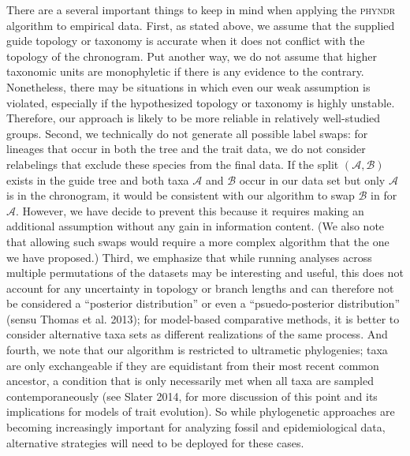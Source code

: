 \documentclass[a4paper,11pt]{article}
\begin{document}
There are a several important things to keep in mind when applying the \textsc{phyndr} algorithm to empirical data. First, as stated above, we assume that the supplied guide topology or taxonomy is accurate when it does not conflict with the topology of the chronogram. Put another way, we do not assume that higher taxonomic units are monophyletic if there is any evidence to the contrary. Nonetheless, there may be situations in which even our weak assumption is violated, especially if the hypothesized topology or taxonomy is highly unstable. Therefore, our approach is likely to be more reliable in relatively well-studied groups. Second, we technically do not generate all possible label swaps: for lineages that occur in both the tree and the trait data, we do not consider relabelings that exclude these species from the final data. If the split $(\mathcal{A,B})$ exists in the guide tree and both taxa $\mathcal{A}$ and $\mathcal{B}$ occur in our data set but only $\mathcal{A}$ is in the chronogram, it would be consistent with our algorithm to swap $\mathcal{B}$ in for $\mathcal{A}$. However, we have decide to prevent this because it requires making an additional assumption without any gain in information content. (We also note that allowing such swaps would require a more complex algorithm that the one we have proposed.) Third, we emphasize that while running analyses across multiple permutations of the datasets may be interesting and useful, this does not account for any uncertainty in topology or branch lengths and can therefore not be considered a ``posterior distribution'' or even a ``psuedo-posterior distribution'' (sensu Thomas et al. 2013); for model-based comparative methods, it is better to consider alternative taxa sets as different realizations of the same process. And fourth, we note that our algorithm is restricted to ultrametic phylogenies; taxa are only exchangeable if they are equidistant from their most recent common ancestor, a condition that is only necessarily met when all taxa are sampled contemporaneously (see Slater 2014, for more discussion of this point and its implications for models of trait evolution). So while phylogenetic approaches are becoming increasingly important for analyzing fossil and epidemiological data, alternative strategies will need to be deployed for these cases.
\end{document}
